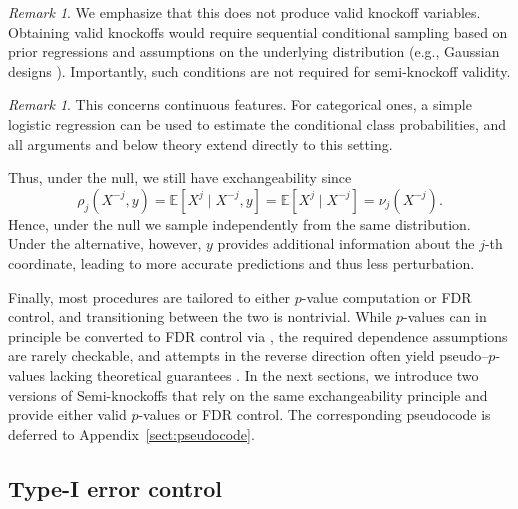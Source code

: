 \documentclass{article}
\theoremstyle{plain}
\theoremstyle{definition}
\theoremstyle{remark}
\newtheorem{remark}[theorem]{Remark}
\begin{document}
\begin{remark}
We emphasize that this does not produce valid knockoff variables. 
Obtaining valid knockoffs would require sequential conditional sampling based on prior regressions \cite{candes2018panning} and assumptions on the underlying distribution (e.g., Gaussian designs \cite{blain2025knockoffsfaildiagnosingfixing}). 
Importantly, such conditions are not required for semi-knockoff validity.
\end{remark}
\begin{remark}
This concerns continuous features. For categorical ones, a simple logistic regression can be used to estimate the conditional class probabilities, and all arguments and below theory extend directly to this setting.
\end{remark}


Thus, under the null, we still have exchangeability since
\[
\rho_j(X^{-j}, y) = \mathbb{E}[X^j \mid X^{-j}, y]
= \mathbb{E}[X^j \mid X^{-j}]
= \nu_j(X^{-j}).
\]
Hence, under the null we sample independently from the same distribution. 
Under the alternative, however, $y$ provides additional information about the $j$-th coordinate, leading to more accurate predictions and thus less perturbation.

Finally, most procedures are tailored to either $p$-value computation or FDR control, and transitioning between the two is nontrivial. 
%
While $p$-values can in principle be converted to FDR control via \cite{BH}, the required dependence assumptions are rarely checkable, and attempts in the reverse direction often yield pseudo–$p$-values lacking theoretical guarantees \cite{aggreg_KO}.
%
In the next sections, we introduce two versions of Semi-knockoffs that rely on the same exchangeability principle and provide either valid $p$-values or FDR control. 
%
The corresponding pseudocode is deferred to Appendix~\ref{sect:pseudocode}.




\subsection{Type-I error control}
\end{document}
